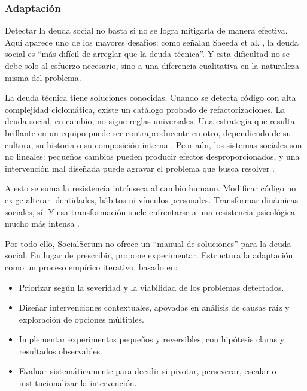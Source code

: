 \FloatBarrier

\subsubsection{Adaptación}

Detectar la deuda social no basta si no se logra mitigarla de manera efectiva.
Aquí aparece uno de los mayores desafíos: como señalan Saeeda et al. \cite{saeeda2024nontechnicaldebt}, la deuda social es ``más difícil de arreglar que la deuda técnica''.
Y esta dificultad no se debe solo al esfuerzo necesario, sino a una diferencia cualitativa en la naturaleza misma del problema.

La deuda técnica tiene soluciones conocidas.
Cuando se detecta código con alta complejidad ciclomática, existe un catálogo probado de refactorizaciones.
La deuda social, en cambio, no sigue reglas universales.
Una estrategia que resulta brillante en un equipo puede ser contraproducente en otro, dependiendo de su cultura, su historia o su composición interna \cite{caballero2022communitysmells}.
Peor aún, los sistemas sociales son no lineales: pequeños cambios pueden producir efectos desproporcionados, y una intervención mal diseñada puede agravar el problema que busca resolver \cite[p. 94]{tamburri2013socialdebt}.

A esto se suma la resistencia intrínseca al cambio humano.
Modificar código no exige alterar identidades, hábitos ni vínculos personales.
Transformar dinámicas sociales, sí.
Y esa transformación suele enfrentarse a una resistencia psicológica mucho más intensa \cite{ryan_self-determination_2000}.

Por todo ello, SocialScrum no ofrece un ``manual de soluciones'' para la deuda social.
En lugar de prescribir, propone experimentar.
Estructura la adaptación como un proceso empírico iterativo, basado en:

\begin{itemize}
    \item Priorizar según la severidad y la viabilidad de los problemas detectados.
    \item Diseñar intervenciones contextuales, apoyadas en análisis de causas raíz y exploración de opciones múltiples.
    \item Implementar experimentos pequeños y reversibles, con hipótesis claras y resultados observables.
    \item Evaluar sistemáticamente para decidir si pivotar, perseverar, escalar o institucionalizar la intervención.
\end{itemize}

